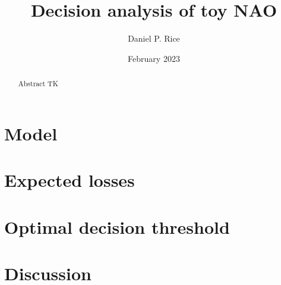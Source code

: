 \documentclass[12pt, letterpaper]{article}
\title{Decision analysis of toy NAO}
\author{Daniel P. Rice}
\date{February 2023}
\begin{document}
\maketitle

\begin{abstract}
    Abstract TK
\end{abstract}

\tableofcontents

\section{Model}

\section{Expected losses}

\section{Optimal decision threshold}

\section{Discussion}
\end{document}
